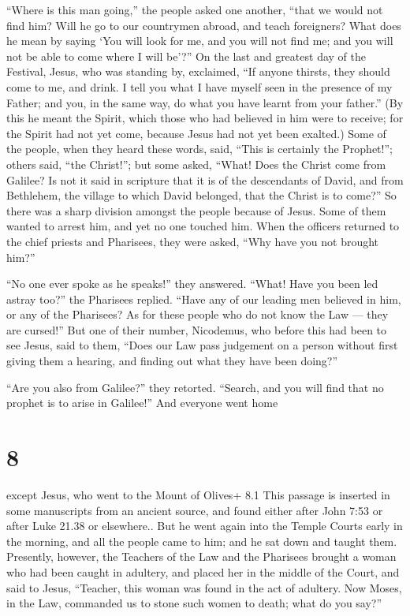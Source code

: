  ``Where is this man going,'' the people asked one another,
``that we would not find him? Will he go to our countrymen abroad, and
teach foreigners?  What does he mean by saying `You will
look for me, and you will not find me; and you will not be able to come
where I will be'?''  On the last and greatest day of the
Festival, Jesus, who was standing by, exclaimed, ``If anyone thirsts,
they should come to me, and drink.  I tell you what I have
myself seen in the presence of my Father; and you, in the same way, do
what you have learnt from your father.''  (By this he meant
the Spirit, which those who had believed in him were to receive; for the
Spirit had not yet come, because Jesus had not yet been exalted.)
 Some of the people, when they heard these words, said,
``This is certainly the Prophet!'';  others said, ``the
Christ!''; but some asked, ``What! Does the Christ come from Galilee?
 Is not it said in scripture that it is of the descendants
of David, and from Bethlehem, the village to which David belonged, that
the Christ is to come?''  So there was a sharp division
amongst the people because of Jesus.  Some of them wanted
to arrest him, and yet no one touched him.  When the
officers returned to the chief priests and Pharisees, they were asked,
``Why have you not brought him?''

 ``No one ever spoke as he speaks!'' they answered.
 ``What! Have you been led astray too?'' the Pharisees
replied.  ``Have any of our leading men believed in him, or
any of the Pharisees?  As for these people who do not know
the Law --- they are cursed!''  But one of their number,
Nicodemus, who before this had been to see Jesus, said to them,
 ``Does our Law pass judgement on a person without first
giving them a hearing, and finding out what they have been doing?''

 ``Are you also from Galilee?'' they retorted. ``Search,
and you will find that no prophet is to arise in Galilee!''
 And everyone went home

\hypertarget{section-7}{%
\section{8}\label{section-7}}

 except Jesus, who went to the Mount of Olives+ 8.1 This
passage is inserted in some manuscripts from an ancient source, and
found either after John 7:53 or after Luke 21.38 or elsewhere..
 But he went again into the Temple Courts early in the
morning, and all the people came to him; and he sat down and taught
them.  Presently, however, the Teachers of the Law and the
Pharisees brought a woman who had been caught in adultery, and placed
her in the middle of the Court,  and said to Jesus,
``Teacher, this woman was found in the act of adultery.  Now
Moses, in the Law, commanded us to stone such women to death; what do
you say?''

